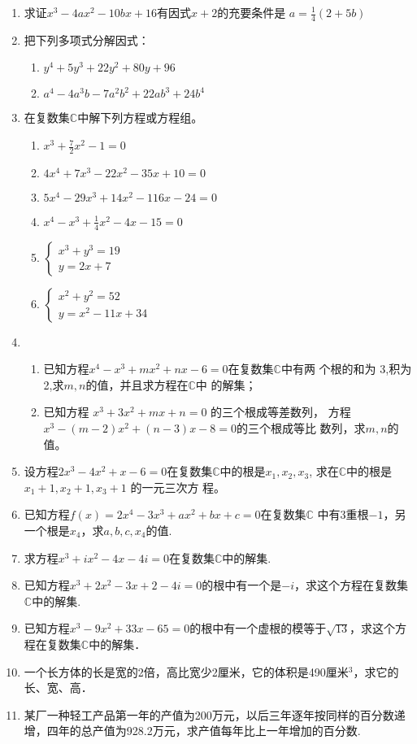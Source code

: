 \begin{enumerate}
\item 求证$x^3-4ax^2-10bx+16$有因式$x+2$的充要条件是
$a=\frac{1}{4}(2+5b)$
\item 把下列多项式分解因式：
\begin{enumerate}[(1)]
\item $y^{4}+ 5y^{3}+ 22y^{2}+ 80y+ 96$ 
\item $a^{4}- 4a^{3}b- 7a^{2}b^{2}+ 22ab^{3}+ 24b^{4}$ 
\end{enumerate}

\item 在复数集$\mathbb{C}$中解下列方程或方程组。
\begin{enumerate}[(1)]
    \item $x^{3}+ \frac 72x^{2}- 1= 0$ 
    \item $4x^{4}+ 7x^{3}- 22x^{2}- 35x+ 10= 0$
    \item $5x^{4}- 29x^{3}+ 14x^{2}- 116x- 24= 0$
    \item $x^{4}- x^{3}+ \frac 14x^{2}- 4x- 15= 0$
    \item $\begin{cases} x^3+ y^3= 19 \\ y= 2x+ 7  \end{cases}$
    \item $\begin{cases}x^{2}+y^{2}=52\\y=x^{2}-11x+34\end{cases}$
\end{enumerate}

\item \begin{enumerate}[(1)]
\item 已知方程$x^4-x^3+mx^2+nx-6=0$在复数集$\mathbb{C}$中有两
个根的和为 3,积为 2,求$m,n$的值，并且求方程在$\mathbb{C}$中
的解集；
\item 已知方程 $x^3+3x^2+mx+n=0$ 的三个根成等差数列，
方程$x^3-(m-2)x^2+(n-3)x-8=0$的三个根成等比
数列，求$m,n$的值。
\end{enumerate}

\item 设方程$2x^3-4x^2+x-6=0$在复数集$\mathbb{C}$中的根是$x_1,x_2,x_3$, 求在$\mathbb{C}$中的根是 $x_1+1,x_2+1,x_3+1$ 的一元三次方
程。
\item 已知方程$f(x)=2x^4-3x^3+ax^2+bx+c=0$在复数集$\mathbb{C}$
中有3重根$-1$，另一个根是$x_4$，求$a,b,c,x_4$的值.
\item 求方程$x^3+ix^2-4x-4i=0$在复数集$\mathbb{C}$中的解集.
\item 已知方程$x^3+2x^2-3x+2-4i=0$的根中有一个是$-i$，求这个方程在复数集$\mathbb{C}$中的解集.
\item 已知方程$x^3-9x^2+33x-65=0$的根中有一个虚根的模等于$\sqrt{13}$，求这个方程在复数集$\mathbb{C}$中的解集．
\item 一个长方体的长是宽的2倍，高比宽少2厘米，它的体积是490厘米$^3$，求它的长、宽、高．
\item 某厂一种轻工产品第一年的产值为200万元，以后三年逐年按同样的百分数递增，四年的总产值为928.2万元，求产值每年比上一年增加的百分数.
\end{enumerate}

